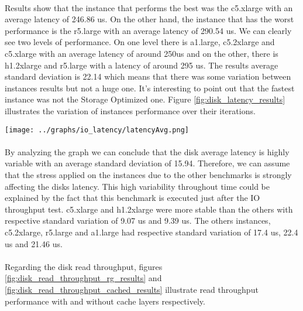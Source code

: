 \documentclass[11pt]{article}
\begin{document}
		\paragraph{} Results show that the instance that performs the best was
		the c5.xlarge with an average latency of 246.86 us. On the other hand,
		the instance that has the worst performance is the r5.large with an
		average latency of 290.54 us. We can clearly see two levels of
		performance. On one level there is a1.large, c5.2xlarge and c5.xlarge
		with an average latency of around 250us and on the other, there is
		h1.2xlarge and r5.large with a latency of around 295 us. The results
		average standard deviation is 22.14 which means that there was some
		variation between instances results but not a huge one.  It’s
		interesting to point out that the fastest instance was not the Storage
		Optimized one. Figure \ref{fig:disk_latency_results} illustrates the
		variation of instances performance over their iterations.

		\begin{center}
		\begin{minipage}{0.6\textwidth}
			 \label{fig:disk_latency_results}
			\texttt{[image: ../graphs/io\_latency/latencyAvg.png]}
		\end{minipage}
		\end{center}

		\paragraph{} By analyzing the graph we can conclude that the disk
		average latency is highly variable with an average standard deviation of
		15.94. Therefore, we can assume that the stress applied on the instances
		due to the other benchmarks is strongly affecting the disks latency.
		This high variability throughout time could be explained by the fact
		that this benchmark is executed just after the IO throughput test.
		c5.xlarge and h1.2xlarge were more stable than the others with
		respective standard variation of 9.07 us and 9.39 us.  The others
		instances, c5.2xlarge, r5.large and a1.large had respective standard
		variation of 17.4 us, 22.4 us and 21.46 us. 

		\paragraph{} Regarding the disk read throughput, figures \ref{fig:disk_read_throughput_rg_results}
		and \ref{fig:disk_read_throughput_cached_results} illustrate read
		throughput performance with and without cache layers respectively.
\end{document}
